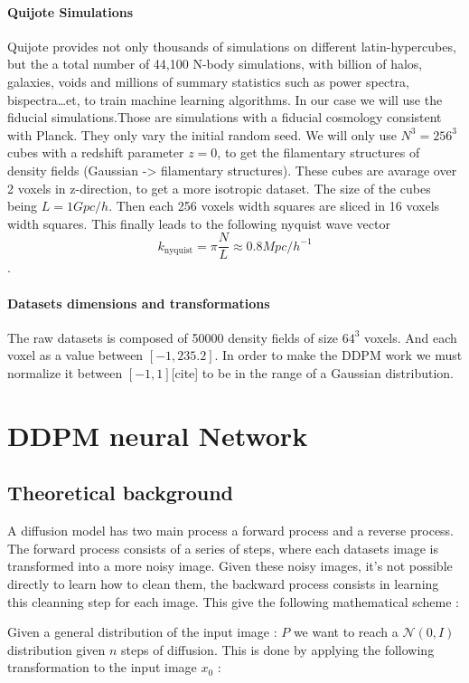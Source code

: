 \documentclass[11pt,a4paper]{report}
\begin{document}
\begin{multicols*}{2}
    \subsubsection{Quijote Simulations}
    Quijote provides not only thousands of simulations on different latin-hypercubes, but the a total number of 44,100 N-body simulations, with billion of halos, galaxies, voids and millions of summary statistics such as power spectra, bispectra…et, to train machine learning algorithms.
    In our case we will use the fiducial simulations.Those are simulations with a fiducial cosmology consistent with Planck. They only vary the initial random seed. We will only use $N^3 = 256^3$ cubes with a redshift parameter $z=0$, to get the filamentary structures of density fields (Gaussian -> filamentary structures).
    These cubes are avarage over 2 voxels in z-direction, to get a more isotropic dataset. The size of the cubes being $L=1Gpc/h$. Then each 256 voxels width squares are sliced in 16 voxels width squares. This finally leads to the following nyquist wave vector $$ k_{\text{nyquist}} = \pi \frac{N}{L} \approx 0.8 Mpc/h^{-1}$$ .


    \subsubsection{Datasets dimensions and transformations}
    The raw datasets is composed of 50000 density fields of size $64^3$ voxels. And each voxel as a value between $[-1, 235.2]$. In order to make the DDPM work we must normalize it between $[-1,1]$[cite] to be in the range of a Gaussian distribution.
    \chapter{DDPM neural Network}
    \section{Theoretical background}
    A diffusion model has two main process a forward process and a reverse process. The forward process consists of a series of steps, where each datasets image is transformed into a more noisy image. Given these noisy images, it's not possible directly to learn how to clean them, the backward process consists in learning this cleanning step for each image.
    This give the following mathematical scheme :

    Given a general distribution of the input image : $P$ we want to reach a $\mathcal{N} (0,I)$ distribution given $n$ steps of diffusion.
    This is done by applying the following transformation to the input image $x_0$ :


\end{multicols*}
\end{document}
